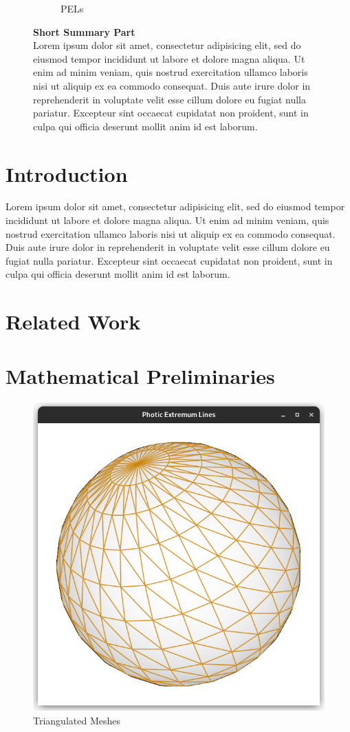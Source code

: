 \documentclass[9pt,fleqn,twoside,twocolumn]{stdglobal}
\begin{document}
\begin{figure}
\begin{subfigure}[b]{0.24\textwidth}
      \caption{PELs}
    \end{subfigure}%
    \caption{\textbf{Short Summary Part}\\
    Lorem ipsum dolor sit amet, consectetur adipisicing elit, sed do eiusmod
    tempor incididunt ut labore et dolore magna aliqua. Ut enim ad minim veniam,
    quis nostrud exercitation ullamco laboris nisi ut aliquip ex ea commodo
    consequat. Duis aute irure dolor in reprehenderit in voluptate velit esse
    cillum dolore eu fugiat nulla pariatur. Excepteur sint occaecat cupidatat non
    proident, sunt in culpa qui officia deserunt mollit anim id est laborum.}
  \end{figure}

\section{Introduction}
  Lorem ipsum dolor sit amet, consectetur adipisicing elit, sed do eiusmod
  tempor incididunt ut labore et dolore magna aliqua. Ut enim ad minim veniam,
  quis nostrud exercitation ullamco laboris nisi ut aliquip ex ea commodo
  consequat. Duis aute irure dolor in reprehenderit in voluptate velit esse
  cillum dolore eu fugiat nulla pariatur. Excepteur sint occaecat cupidatat non
  proident, sunt in culpa qui officia deserunt mollit anim id est laborum.

\section{Related Work}

\section{Mathematical Preliminaries}
  \begin{figure}
    \centering
    \includegraphics[width=0.6\linewidth,trim={15px 15 15 50},clip]{images/sphere-wireframe.png}
    \caption{Triangulated Meshes}
  \end{figure}
\end{document}
